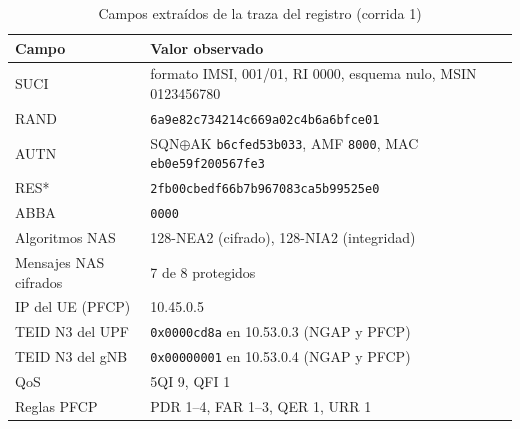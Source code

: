 \documentclass[conference]{IEEEtran}
\begin{document}
\begin{table}[!t]
\caption{Campos extraídos de la traza del registro (corrida 1)}
\label{tab:campos}
\centering
\footnotesize
\renewcommand{\arraystretch}{1.12}
\begin{tabular}{p{2.4cm}p{5.2cm}}
\toprule
\textbf{Campo} & \textbf{Valor observado} \\
\midrule
SUCI & formato IMSI, 001/01, RI 0000, esquema nulo, MSIN 0123456780 \\
RAND & {\scriptsize\texttt{6a9e82c734214c669a02c4b6a6bfce01}} \\
AUTN & SQN$\oplus$AK \texttt{b6cfed53b033}, AMF \texttt{8000}, MAC \texttt{eb0e59f200567fe3} \\
RES* & {\scriptsize\texttt{2fb00cbedf66b7b967083ca5b99525e0}} \\
ABBA & \texttt{0000} \\
Algoritmos NAS & 128-NEA2 (cifrado), 128-NIA2 (integridad) \\
Mensajes NAS cifrados & 7 de 8 protegidos \\
IP del UE (PFCP) & 10.45.0.5 \\
TEID N3 del UPF & \texttt{0x0000cd8a} en 10.53.0.3 (NGAP y PFCP) \\
TEID N3 del gNB & \texttt{0x00000001} en 10.53.0.4 (NGAP y PFCP) \\
QoS & 5QI 9, QFI 1 \\
Reglas PFCP & PDR 1--4, FAR 1--3, QER 1, URR 1 \\
\bottomrule
\end{tabular}
\end{table}
\end{document}
